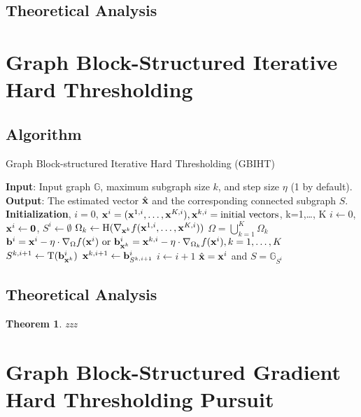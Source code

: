 \documentclass{article}
\let\oldReturn\Return
\renewcommand{\Return}{\State\oldReturn}
\newtheorem{theorem}{Theorem}
\begin{document}
\subsection{Theoretical Analysis}

\section{Graph Block-Structured Iterative Hard Thresholding}

\subsection{Algorithm}

\begin{algorithm}
	\caption{Graph Block-structured Iterative Hard Thresholding (GBIHT)}\label{alg:gbiht}
	\begin{algorithmic}[1]
		\State \textbf{Input}: Input graph $\mathbb{G}$, maximum subgraph size $k$, and step size $\eta$ (1 by default).
		\State \textbf{Output}: The estimated vector $\hat{{\bf x}}$ and the corresponding connected subgraph $S$.
		\State \textbf{Initialization}, $ i=0 $, ${\bf x}^i=({\bf x}^{1,i},\dots,{\bf x}^{K,i}), {\bf x}^{k,i}=\text{initial vectors}$, k=1,\dots, K
		\State $i\gets 0$, ${\bf x}^i\gets {\bf 0}$, $S^i\gets\emptyset$
		\Repeat
		\State $\Omega_k\gets\mathrm{H}(\nabla_{{\bf x}^k} f({\bf x}^{1,i},\dots,{\bf x}^{K,i}))$
		\EndFor
		\State $\Omega=\bigcup_{k=1}^K \Omega_k$
		\State ${\bf b}^i={\bf x}^i-\eta\cdot\nabla_{\Omega}f({\bf x}^i)\text{ or }{\bf b}_{{\bf x}^k}^i={\bf x}^{k,i} -\eta\cdot \nabla_{\Omega_k} f({\bf x}^i), k=1,\dots,K$\label{alg:gbiht:update}
		\State $S^{k,i+1}\gets\mathrm{T}({\bf b}_{{\bf x}^k}^i)$
		\State ${\bf x}^{k,i+1}\gets{\bf b}_{S^{k,i+1}}^i$
		\EndFor
		\State $i\gets i+1$
		\Return $\hat{{\bf x}}={\bf x}^i$ and $S=\mathbb{G}_{S^i}$
	\end{algorithmic}
\end{algorithm}

\subsection{Theoretical Analysis}

\begin{theorem}\label{thm:blockiht:converge}
zzz
\end{theorem}

\section{Graph Block-Structured Gradient Hard Thresholding Pursuit}
\end{document}
